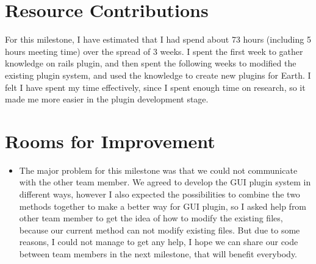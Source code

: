 \documentclass{article}
\begin{document}
\section*{Resource Contributions}

For this milestone, I have estimated that I had spend about 73 hours (including 5 hours meeting time) over the spread of 3 weeks. I spent the first week to gather knowledge on rails plugin, and then spent the following weeks to modified the existing plugin system, and used the knowledge to create new plugins for Earth. I felt I have spent my time effectively, since I spent enough time on research, so it made me more easier in the plugin development stage. 

\section*{Rooms for Improvement}

\begin{itemize}
   \item The major problem for this milestone was that we could not communicate with the other team member. We agreed to develop the GUI plugin system in different ways, however I also expected the possibilities to combine the two methods together to make a better way for GUI plugin, so I asked help from other team member to get the idea of how to modify the existing files, because our current method can not modify existing files. But due to some reasons, I could not manage to get any help, I hope we can share our code between team members in the next milestone, that will benefit everybody.
\end{itemize}
\end{document}
